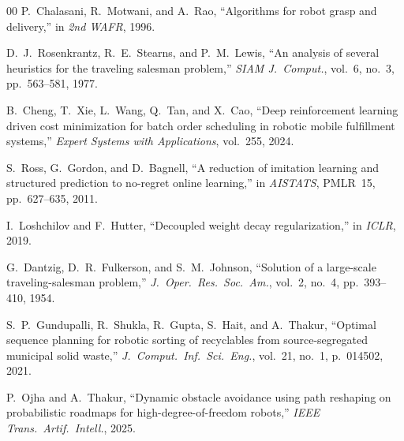 \documentclass[conference]{IEEEtran}
\begin{document}
\begin{thebibliography}{00}
 P.~Chalasani, R.~Motwani, and A.~Rao, ``Algorithms for robot grasp and delivery,'' in \emph{2nd WAFR}, 1996.

 D.~J.~Rosenkrantz, R.~E.~Stearns, and P.~M.~Lewis, ``An analysis of several heuristics for the traveling salesman problem,'' \emph{SIAM J.\ Comput.}, vol.~6, no.~3, pp.~563--581, 1977.

 B.~Cheng, T.~Xie, L.~Wang, Q.~Tan, and X.~Cao, ``Deep reinforcement learning driven cost minimization for batch order scheduling in robotic mobile fulfillment systems,'' \emph{Expert Systems with Applications}, vol.~255, 2024.

 S.~Ross, G.~Gordon, and D.~Bagnell, ``A reduction of imitation learning and structured prediction to no-regret online learning,'' in \emph{AISTATS}, PMLR~15, pp.~627--635, 2011.

 I.~Loshchilov and F.~Hutter, ``Decoupled weight decay regularization,'' in \emph{ICLR}, 2019.

 G.~Dantzig, D.~R.~Fulkerson, and S.~M.~Johnson, ``Solution of a large-scale traveling-salesman problem,'' \emph{J.\ Oper.\ Res.\ Soc.\ Am.}, vol.~2, no.~4, pp.~393--410, 1954.

 S.~P.~Gundupalli, R.~Shukla, R.~Gupta, S.~Hait, and A.~Thakur, ``Optimal sequence planning for robotic sorting of recyclables from source-segregated municipal solid waste,'' \emph{J.\ Comput.\ Inf.\ Sci.\ Eng.}, vol.~21, no.~1, p.~014502, 2021.

 P.~Ojha and A.~Thakur, ``Dynamic obstacle avoidance using path reshaping on probabilistic roadmaps for high-degree-of-freedom robots,'' \emph{IEEE Trans.\ Artif.\ Intell.}, 2025.

\end{thebibliography}
\end{document}
